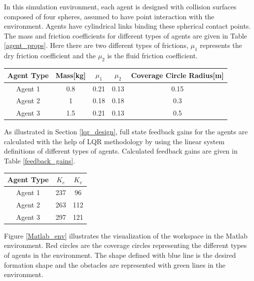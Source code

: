 In this simulation environment, each agent is designed with collision surfaces composed of four spheres, assumed to have point interaction with the environment. Agents have cylindrical links binding these spherical contact points. The mass and friction coefficients for different types of agents are given in Table \ref{agent_props}. Here there are two different types of frictions, $\mu_1$ represents the dry friction coefficient and the $\mu_2$ is the fluid friction coefficient.

\begin{center}
 \label{agent_props} 
\begin{tabular}{||c| c| c |c |c||}
				
\hline
\textbf{Agent Type} & \textbf{Mass[kg]}  & \textbf{$\mu_1$} & \textbf{$\mu_2$} & \textbf{Coverage Circle Radius[m]} \\ 
\hline
Agent 1& 0.8 & 0.21  & 0.13 & 0.15\\
Agent 2& 1   &  0.18 & 0.18 & 0.3\\	
Agent 3& 1.5 &  0.21 & 0.13 & 0.5\\	
\hline
\end{tabular}
\end{center}

As illustrated in Section \ref{lqr_design}, full state feedback gains for the agents are calculated with the help of LQR methodology by using the linear system definitions of different types of agents. Calculated feedback gains are given in Table \ref{feedback_gains}.

\begin{center}
 \label{feedback_gains} 
\begin{tabular}{||c| c |c||}
				
\hline
\textbf{Agent Type} & \textbf{$K_e$}  & \textbf{$K_v$} \\ 
\hline
Agent 1& 237 & 96\\
Agent 2& 263 & 112\\
Agent 3& 297 & 121\\
\hline
\end{tabular}
\end{center}

Figure \ref{Matlab_env} illustrates the visualization of the workspace in the Matlab environment. Red circles are the coverage circles representing the different types of agents in the environment. The shape defined with blue line is the desired formation shape and the obstacles are represented with green lines in the environment. 

